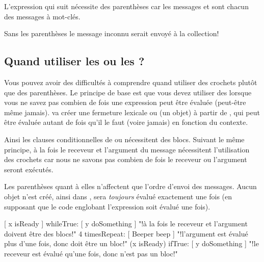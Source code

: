 \documentclass[a4paper,10pt,twoside]{book}
\begin{document}
L'expression qui suit n\'ecessite des parenth\`eses car les messages  et  sont chacun des messages \`a mot-cl\'es. 

\noindent
Sans les parenth\`eses le message inconnu  serait envoy\'e \`a la collection!

\subsection{Quand utiliser les \lct{[ ]} ou les \lct{( )} ?}

Vous pouvez avoir des difficult\'es \`a comprendre quand utiliser des crochets plut\^ot que des parenth\`eses.
Le principe de base est que vous devez utiliser des \ct{[ ]} lorsque vous ne savez pas combien de fois une expression peut \^etre \'evalu\'ee (peut-\^etre m\^eme jamais).
 va cr\'eer une fermeture lexicale ou
 (\ie un objet) \`a partir de
\mbox{,} qui peut \^etre \'evalu\'ee autant de
fois qu'il le faut (voire jamais) en fonction du contexte.

Ainsi les clauses conditionnelles de  ou  n\'ecessitent des blocs. Suivant le m\^eme principe, \`a la fois le receveur et l'argument du message  n\'ecessitent l'utilisation des crochets car nous ne savons pas combien de fois le receveur ou l'argument seront ex\'ecut\'es.

Les parenth\`eses quant \`a elles n'affectent que l'ordre d'envoi des messages.
Aucun objet n'est cr\'e\'e, ainsi dans ,
 sera \emph{toujours} \'evalu\'e exactement une
fois 
(en supposant que le code englobant l'expression soit \'evalu\'e une
fois).

\begin{code}{}
[ x isReady ] whileTrue: [ y doSomething ]   "!\`a la fois le receveur et l'argument doivent \^etre des blocs!"
4 timesRepeat: [ Beeper beep ]                   "!l'argument est \'evalu\'e plus d'une fois, donc doit \^etre un bloc!"
(x isReady) ifTrue: [ y doSomething ]           "!le receveur est \'evalu\'e qu'une fois, donc n'est pas un bloc!"
\end{code}
\end{document}

